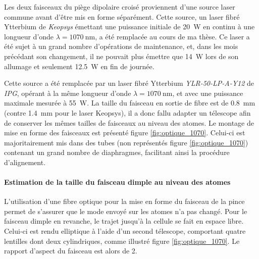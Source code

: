 Les deux faisceaux du piège dipolaire croisé proviennent d'une source laser commune avant d'être mis en forme séparément. Cette source, un laser fibré Ytterbium de \emph{Keopsys} émettant une puissance initiale de \SI{20}{\watt} en continu à une longueur d'onde $\lambda=\SI{1070}{\nano\metre}$, a été remplacée au cours de ma thèse. Ce laser a été sujet à un grand nombre d'opérations de maintenance, et, dans les mois précédant son changement, il ne pouvait plus émettre que \SI{14}{\watt} lors de son allumage et seulement \SI{12.5}{\watt} en fin de journée.
 
Cette source a été remplacée par un laser fibré Ytterbium \emph{YLR-50-LP-A-Y12} de \emph{IPG}, opérant à la même longueur d'onde $\lambda=\SI{1070}{\nano\metre}$, et avec une puissance maximale mesurée à \SI{55}{\watt}. La taille du faisceau en sortie de fibre est de \SI{0.8}{\milli\metre} (contre \SI{1.4}{\milli\metre} pour le laser Keopsys), il a donc fallu adapter un télescope afin de conserver les mêmes tailles de faisceaux au niveau des atomes. Le montage de mise en forme des faisceaux est présenté figure \ref{fig:optique_1070}. Celui-ci est majoritairement mis dans des tubes (non représentés figure \ref{fig:optique_1070}) contenant un grand nombre de diaphragmes, facilitant ainsi la procédure d'alignement.



\paragraph*{Estimation de la taille du faisceau dimple au niveau des atomes}
L'utilisation d'une fibre optique pour la mise en forme du faisceau de la pince permet de s'assurer que le mode envoyé sur les atomes n'a pas changé. Pour le faisceau dimple en revanche, le trajet jusqu'à la cellule se fait en espace libre. Celui-ci est rendu elliptique à l'aide d'un second télescope, comportant quatre lentilles dont deux cylindriques, comme illustré figure \ref{fig:optique_1070}. Le rapport d'aspect du faisceau est alors de 2. 




